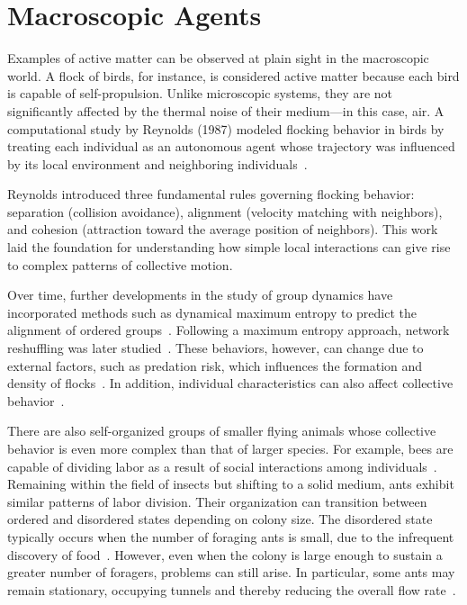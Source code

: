 \section{Macroscopic Agents}

Examples of active matter can be observed at plain sight in the macroscopic world. A flock of birds, for instance, is considered active matter because each bird is capable of self-propulsion. Unlike microscopic systems, they are not significantly affected by the thermal noise of their medium—in this case, air. A computational study by Reynolds (1987) modeled flocking behavior in birds by treating each individual as an autonomous agent whose trajectory was influenced by its local environment and neighboring individuals~\cite{reynolds1987flocks}.

Reynolds introduced three fundamental rules governing flocking behavior: separation (collision avoidance), alignment (velocity matching with neighbors), and cohesion (attraction toward the average position of neighbors). This work laid the foundation for understanding how simple local interactions can give rise to complex patterns of collective motion. 

Over time, further developments in the study of group dynamics have incorporated methods such as dynamical maximum entropy to predict the alignment of ordered groups~\cite{cavagna2014dynamical}. Following a maximum entropy approach, network reshuffling was later studied~\cite{mora1511questioning}. These behaviors, however, can change due to external factors, such as predation risk, which influences the formation and density of flocks~\cite{carere2009aerial}. In addition, individual characteristics can also affect collective behavior~\cite{couzin2002collective}.


There are also self-organized groups of smaller flying animals whose collective behavior is even more complex than that of larger species. For example, bees are capable of dividing labor as a result of social interactions among individuals~\cite{jeanson2005emergence}. Remaining within the field of insects but shifting to a solid medium, ants exhibit similar patterns of labor division. Their organization can transition between ordered and disordered states depending on colony size. The disordered state typically occurs when the number of foraging ants is small, due to the infrequent discovery of food~\cite{beekman2001phase}. However, even when the colony is large enough to sustain a greater number of foragers, problems can still arise. In particular, some ants may remain stationary, occupying tunnels and thereby reducing the overall flow rate~\cite{aguilar2018collective}.

